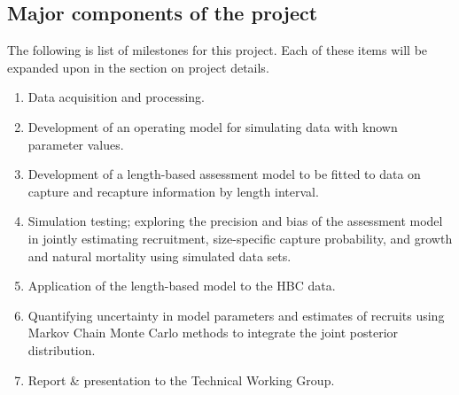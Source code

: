 \subsection*{Major components of the project}
The following is list of milestones for this project.  Each of these items will be expanded upon in the section on project details.
\begin{enumerate}
	\item Data acquisition and processing.
	\item Development of an operating model for simulating data with known parameter values.
	\item Development of a length-based assessment model to be fitted to data on capture and recapture information by length interval.
	\item Simulation testing; exploring the precision and bias of the assessment model in jointly estimating recruitment, size-specific capture probability, and growth and natural mortality using simulated data sets.
	\item Application of the length-based model to the HBC data.
	\item Quantifying uncertainty in model parameters and estimates of recruits using Markov Chain Monte Carlo methods to integrate the joint posterior distribution.
	\item Report \& presentation to the Technical Working Group.
\end{enumerate}

